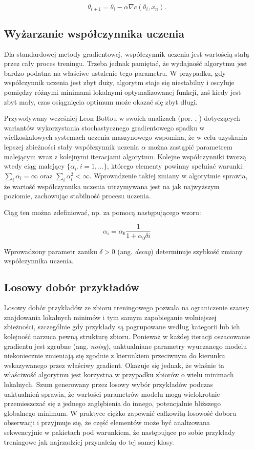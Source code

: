 \documentclass{pracamgr}
\begin{document}
\[
\theta_{i+1} = \theta_{i} - \alpha \nabla c(\theta_{i}, x_n).
\]

\subsection{Wyżarzanie współczynnika uczenia}
Dla standardowej metody gradientowej, współczynnik uczenia jest wartością stałą przez cały proces treningu. Trzeba jednak pamiętać, że wydajność algorytmu jest bardzo podatna na właściwe ustalenie tego parametru. W przypadku, gdy współczynnik uczenia jest zbyt duży, algorytm staje się niestabilny i oscyluje pomiędzy różnymi minimami lokalnymi optymalizowanej funkcji, zaś kiedy jest zbyt mały, czas osiągnięcia optimum może okazać się zbyt długi.

Przywoływany wcześniej Leon Bottou w swoich analizach (por. \cite{bottou}, \cite{bottou2}) dotyczących wariantów wykorzystania stochastycznego gradientowego spadku w wielkoskalowych systemach uczenia maszynowego wspomina, że w celu uzyskania lepszej zbieżności stały współczynnik uczenia $\alpha$ można zastąpić parametrem malejącym wraz z kolejnymi iteracjami algorytmu. Kolejne współczynniki tworzą wtedy ciąg malejący $\{ \alpha_i, i = 1, ... \}$, którego elementy powinny spełniać warunki: $\sum_{i} \alpha_{i} = \infty$ oraz $\sum_{i} \alpha_{i}^2 < \infty$. Wprowadzenie takiej zmiany w algorytmie sprawia, że wartość współczynnika uczenia utrzymywana jest na jak najwyższym poziomie, zachowując stabilność procesu uczenia. 

Ciąg ten można zdefiniować, np. za pomocą następującego wzoru:

\[
\alpha_i = \alpha_0 \frac{1}{1 + \alpha_0 \delta i}
\]

Wprowadzony parametr zaniku $\delta > 0$ (ang. \textit{decay}) determinuje szybkość zmiany współczynnika uczenia. 

\subsection{Losowy dobór przykładów}

Losowy dobór przykładów ze zbioru treningowego pozwala na ograniczenie szansy znajdowania lokalnych minimów i tym samym zapobieganie wolniejszej zbieżności, szczególnie gdy przykłady są pogrupowane według kategorii lub ich kolejność narzuca pewną strukturę zbioru. Ponieważ w każdej iteracji oszacowanie gradientu jest zgrubne (ang. \textit{noisy}), uaktualniane parametry wyuczanego modelu niekoniecznie zmieniają się zgodnie z kierunkiem przeciwnym do kierunku wskazywanego przez właściwy gradient. Okazuje się jednak, że właśnie ta właściwość algorytmu jest korzystna w przypadku zbiorów o wielu minimach lokalnych. Szum generowany przez losowy wybór przykładów podczas uaktualnień sprawia, że wartości parametrów modelu mogą wielokrotnie przemieszczać się z jednego zagłębienia do innego, potencjalnie bliższego globalnego minimum. W praktyce ciężko zapewnić całkowitą losowość doboru obserwacji i przyjmuje się, że część elementów może być analizowana sekwencyjnie w pakietach pod warunkiem, że następujące po sobie przykłady treningowe jak najrzadziej przynależą do tej samej klasy.
\end{document}
